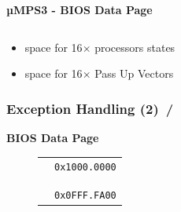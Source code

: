 \documentclass{beamer}
\begin{document}
\begin{frame}
\begin{center}
\begin{minipage}{0.47\textwidth}
\begin{block}{\textbf{{\small µMPS3 - BIOS Data Page}}}
\begin{figure}[h]
\begin{tabular}{rcl}
					\end{tabular}
				\end{figure}
				\begin{scriptsize}
					\begin{itemize}
						\item space for 16$\times$ processors states
						\item space for 16$\times$ Pass Up Vectors
					\end{itemize}
				\end{scriptsize}
			\end{block}
		\end{minipage}
	\end{center}
\end{frame}

\begin{frame}
	\frametitle{Exception Handling (2) \hspace{0pt plus 1 filll} \insertframenumber\,/\,\inserttotalframenumber}
	\begin{center}
		\begin{minipage}{0.49\textwidth}
			\begin{block}{\textbf{BIOS Data Page}}
				\begin{figure}[h]
					\renewcommand{\arraystretch}{0.91}
					\begin{tabular}{cl}
						\multicolumn{1}{l}{}                                                                                          & \multirow{2}{*}{\texttt{{\tiny 0x1000.0000}}} \\ \hhline{-~}
						\multicolumn{1}{|l|}{\multirow{4}{*}{\cellcolor{nord0}}}                                                      &                                               \\
						\multicolumn{1}{|l|}{\cellcolor{nord0}}                                                                       &                                               \\
						\multicolumn{1}{|l|}{\cellcolor{nord0}}                                                                       &                                               \\
						\multicolumn{1}{|l|}{\cellcolor{nord0}}                                                                       & \multirow{2}{*}{\texttt{{\tiny 0x0FFF.FA00}}} \\ \hhline{-~}
						\multicolumn{1}{|c|}{\cellcolor{nord10}}                                                                      &                                               \\

\end{tabular}
\end{figure}
\end{block}
\end{minipage}
\end{center}
\end{frame}
\end{document}
